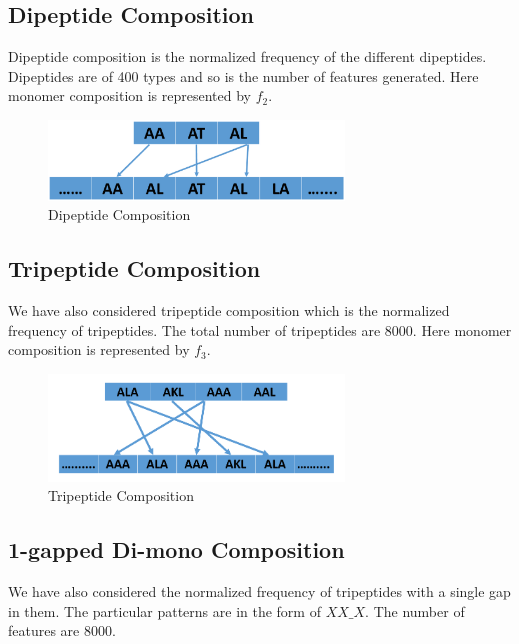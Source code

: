 \subsection{Dipeptide Composition}
Dipeptide composition is the normalized frequency of the different dipeptides. Dipeptides are of 400 types and so is the number of features generated. Here monomer composition is represented by $f_2$.
    
\begin{figure}[H]
\centering
 \includegraphics[width=0.7\textwidth]{Dipeptidenew.eps}
 \caption{Dipeptide Composition}
\end{figure}

\subsection{Tripeptide Composition}
We have also considered tripeptide composition which is the normalized frequency of tripeptides. The total number of tripeptides are 8000. Here monomer composition is represented by $f_3$.

\begin{figure}[H]
\centering
 \includegraphics[width=0.7\textwidth]{tripeptide.PNG}
 \caption{Tripeptide Composition}
\end{figure}

\subsection{1-gapped Di-mono Composition}
We have also considered the normalized frequency of tripeptides with a single gap in them. The particular patterns are in the form of $XX\_X$. The number of features are 8000.

